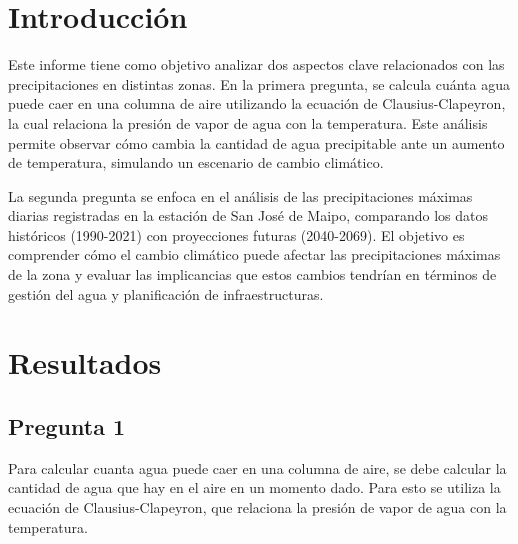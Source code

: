 \documentclass{article}  %
\begin{document}
\newpage
\thispagestyle{empty} %
\tableofcontents
\thispagestyle{plain} %
\thispagestyle{empty} %
\newpage

\setcounter{page}{1}
\section{Introducción}
Este informe tiene como objetivo analizar dos aspectos clave relacionados con las precipitaciones en distintas zonas. En la primera pregunta, se calcula cuánta agua puede caer en una columna de aire utilizando la ecuación de Clausius-Clapeyron, la cual relaciona la presión de vapor de agua con la temperatura. Este análisis permite observar cómo cambia la cantidad de agua precipitable ante un aumento de temperatura, simulando un escenario de cambio climático.

La segunda pregunta se enfoca en el análisis de las precipitaciones máximas diarias registradas en la estación de San José de Maipo, comparando los datos históricos (1990-2021) con proyecciones futuras (2040-2069). El objetivo es comprender cómo el cambio climático puede afectar las precipitaciones máximas de la zona y evaluar las implicancias que estos cambios tendrían en términos de gestión del agua y planificación de infraestructuras.

\newpage
\section{Resultados}

\subsection{Pregunta 1}
Para calcular cuanta agua puede caer en una columna de aire, se debe calcular la cantidad de agua que hay en el aire en un momento dado. Para esto se utiliza la ecuación de Clausius-Clapeyron, que relaciona la presión de vapor de agua con la temperatura. \\
\end{document}
